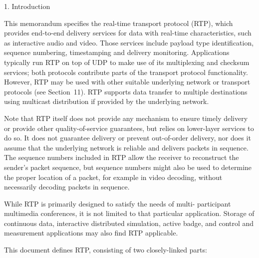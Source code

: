 \documentclass{article}
\begin{document}
1. Introduction

This memorandum specifies the real-time transport protocol (RTP), which provides end-to-end delivery services for data with real-time characteristics, such as interactive audio and video.  Those services include payload type identification, sequence numbering, timestamping and delivery monitoring.  Applications typically run RTP on top of UDP to make use of its multiplexing and checksum services; both protocols contribute parts of the transport protocol functionality. However, RTP may be used with other suitable underlying network or transport protocols (see Section~11).  RTP supports data transfer to multiple destinations using multicast distribution if provided by the underlying network.

Note that RTP itself does not provide any mechanism to ensure timely delivery or provide other quality-of-service guarantees, but relies on lower-layer services to do so.  It does not guarantee delivery or prevent out-of-order delivery, nor does it assume that the underlying network is reliable and delivers packets in sequence.  The sequence numbers included in RTP allow the receiver to reconstruct the sender's packet sequence, but sequence numbers might also be used to determine the proper location of a packet, for example in video decoding, without necessarily decoding packets in sequence.

While RTP is primarily designed to satisfy the needs of multi- participant multimedia conferences, it is not limited to that particular application.  Storage of continuous data, interactive distributed simulation, active badge, and control and measurement applications may also find RTP applicable.

This document defines RTP, consisting of two closely-linked parts:
\end{document}
